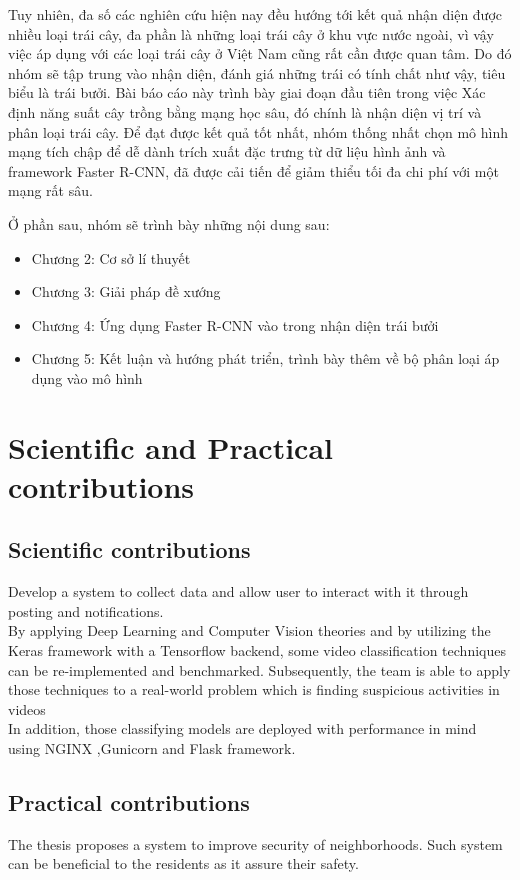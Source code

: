 Tuy nhiên, đa số các nghiên cứu hiện nay đều hướng tới kết quả nhận diện được nhiều loại trái cây, đa phần là những loại trái cây ở khu vực nước ngoài, vì vậy việc áp dụng với các loại trái cây ở Việt Nam cũng rất cần được quan tâm. Do đó nhóm sẽ tập trung vào nhận diện, đánh giá những trái có tính chất như vậy, tiêu biểu là trái bưởi. Bài báo cáo này trình bày giai đoạn đầu tiên trong việc Xác định năng suất cây trồng bằng mạng học sâu, đó chính là nhận diện vị trí và phân loại trái cây. Để đạt được kết quả tốt nhất, nhóm thống nhất chọn mô hình mạng tích chập để dễ dành trích xuất đặc trưng từ  dữ liệu hình ảnh và framework Faster R-CNN, đã được cải tiến để giảm thiểu tối đa chi phí với một mạng rất sâu.

Ở phần sau, nhóm sẽ trình bày những nội dung sau:
\begin{itemize}
	\item Chương 2: Cơ sở lí thuyết
	\item Chương 3: Giải pháp đề xướng
	\item Chương 4: Ứng dụng Faster R-CNN vào trong nhận diện trái bưởi
	\item Chương 5: Kết luận và hướng phát triển, trình bày thêm về bộ phân loại áp dụng vào mô hình
\end{itemize} 
\section{Scientific and Practical contributions}
\subsection{Scientific contributions}
Develop a system to collect data and allow user to interact with it through posting and notifications. \\
By applying Deep Learning and Computer Vision theories and by utilizing the Keras framework with a Tensorflow backend, some video classification techniques can be re-implemented and benchmarked. Subsequently, the team is able to apply those techniques to a real-world problem which is finding suspicious activities in videos \\ %
In addition, those classifying models are deployed with performance in mind using NGINX ,Gunicorn and Flask framework.
\subsection{Practical contributions}
The thesis proposes a system to improve security of neighborhoods. Such system can be beneficial to the residents as it assure their safety.
